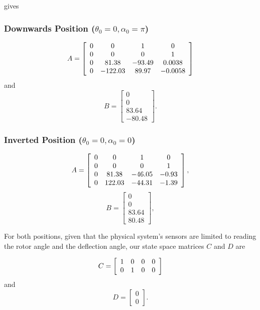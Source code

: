 gives

\subsubsection*{Downwards Position (\( \theta_0=0, \alpha_0=\pi \))}
\[
    A =
    \left[\begin{array}{c c c c}
            0 & 0       & 1      & 0       \\
            0 & 0       & 0      & 1       \\
            0 & 81.38   & -93.49 & 0.0038  \\
            0 & -122.03 & 89.97  & -0.0058 \\
        \end{array}\right]
\]
and
\[
    B =
    \left[\begin{array}{c}
            0     \\
            0     \\
            83.64 \\
            -80.48
        \end{array}\right].
\]

\subsubsection*{Inverted Position (\( \theta_0=0, \alpha_0=0 \))}
\[
    A =
    \left[\begin{array}{c c c c}
            0 & 0      & 1      & 0     \\
            0 & 0      & 0      & 1     \\
            0 & 81.38  & -46.05 & -0.93 \\
            0 & 122.03 & -44.31 & -1.39
        \end{array}\right],
\]
\[
    B =
    \left[\begin{array}{c}
            0     \\
            0     \\
            83.64 \\
            80.48
        \end{array}\right],
\]

For both positions, given that the physical system’s sensors are limited to reading the rotor angle and the deflection angle, our state space matrices \(C\) and \(D\) are

\[
    C =
    \left[\begin{array}{c c c c}
            1 & 0 & 0 & 0 \\
            0 & 1 & 0 & 0
        \end{array}\right]
\]
and
\[
    D =
    \left[\begin{array}{c}
            0 \\
            0
        \end{array}\right].
\]

